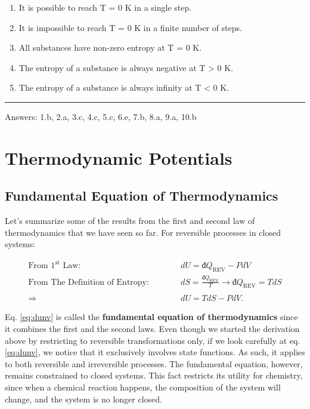 \documentclass[
  9pt,
]{extbook}
\providecommand{\tightlist}{%
  \setlength{\itemsep}{0pt}\setlength{\parskip}{0pt}}
\theoremstyle{definition}
\theoremstyle{definition}
\theoremstyle{definition}
\theoremstyle{remark}
\begin{document}
\begin{enumerate}
\def\labelenumi{\alph{enumi}.}
\tightlist
\item
  It is possible to reach T = 0 K in a single step.
\item
  It is impossible to reach T = 0 K in a finite number of steps.
\item
  All substances have non-zero entropy at T = 0 K.
\item
  The entropy of a substance is always negative at T \textgreater{} 0 K.
\item
  The entropy of a substance is always infinity at T \textless{} 0 K.
\end{enumerate}

\begin{center}\rule{0.5\linewidth}{0.5pt}\end{center}

Answers: 1.b, 2.a, 3.c, 4.c, 5.c, 6.e, 7.b, 8.a, 9.a, 10.b

\hypertarget{Potentials}{%
\chapter{Thermodynamic Potentials}\label{Potentials}}

\hypertarget{fundeq}{%
\section{Fundamental Equation of Thermodynamics}\label{fundeq}}

Let's summarize some of the results from the first and second law of thermodynamics that we have seen so far. For reversible processes in closed systems:

\begin{equation}
\begin{aligned}
\text{From 1}^{\text{st}} \text{ Law:} \qquad \quad & dU = đQ_{\mathrm{REV}}-PdV \\
\text{From The Definition of Entropy:} \qquad \quad & dS = \frac{đQ_{\mathrm{REV}}}{T} \rightarrow đQ_{\mathrm{REV}} = TdS \\
\\
\Rightarrow \quad & dU = TdS - PdV.
\end{aligned}
\label{eq:dunv}
\end{equation}

Eq. \eqref{eq:dunv} is called the \textbf{fundamental equation of thermodynamics} since it combines the first and the second laws. Even though we started the derivation above by restricting to reversible transformations only, if we look carefully at eq. \eqref{eq:dunv}, we notice that it exclusively involves state functions. As such, it applies to both reversible and irreversible processes. The fundamental equation, however, remains constrained to closed systems. This fact restricts its utility for chemistry, since when a chemical reaction happens, the composition of the system will change, and the system is no longer closed.
\end{document}
